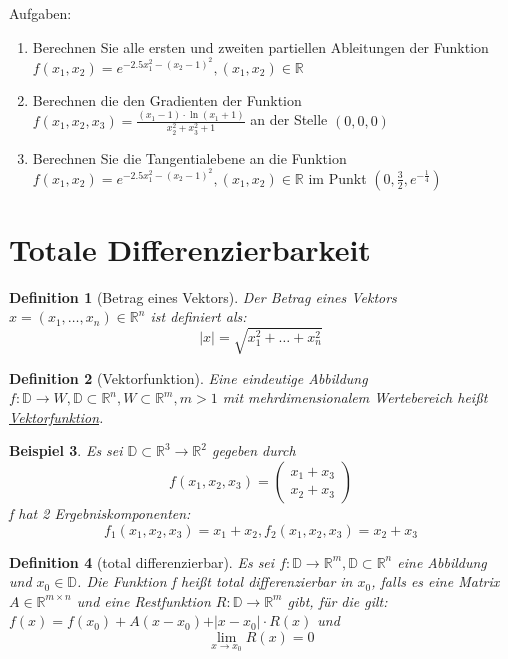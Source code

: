 \documentclass[12pt,a4paper]{scrreprt}
\newtheorem{defi}{Definition}[section]
\newtheorem{beispiel}[defi]{Beispiel}
\begin{document}
Aufgaben:

\begin{enumerate}
	\item Berechnen Sie alle ersten und zweiten partiellen Ableitungen der Funktion $f(x_1,x_2)=e^{-2.5x_1^2-(x_2-1)^2}, (x_1,x_2) \in \mathbb{R}$
	\item Berechnen die den Gradienten der Funktion $f(x_1,x_2,x_3)=\frac{(x_1-1)\cdot\ln(x_1+1)}{x_2^2+x_3^2+1}$ an der Stelle $(0,0,0)$
	\item Berechnen Sie die Tangentialebene an die Funktion  $f(x_1,x_2)=e^{-2.5x_1^2-(x_2-1)^2}, (x_1,x_2) \in \mathbb{R}$ im Punkt $(0,\frac{3}{2},e^{-\frac{1}{4}})$
\end{enumerate}

\section{Totale Differenzierbarkeit}

\begin{defi}[Betrag eines Vektors]
	Der Betrag eines Vektors $x=(x_1,\dots,x_n)\in\mathbb{R}^n$ ist definiert als:
	\[\vert x \vert = \sqrt{x_1^2+\dots+x_n^2}\]
\end{defi}

\begin{defi}[Vektorfunktion]
	Eine eindeutige Abbildung $f:\mathbb{D}\to W,\mathbb{D}\subset\mathbb{R}^n,W\subset\mathbb{R}^m,m>1$ mit mehrdimensionalem Wertebereich heißt \underline{Vektorfunktion}.
\end{defi}

\begin{beispiel}
	Es sei $\mathbb{D}\subset\mathbb{R}^3\to\mathbb{R}^2$ gegeben durch
	\[f(x_1,x_2,x_3)=\begin{pmatrix}
	x_1+x_3 \\ x_2+x_3
	\end{pmatrix}\]
	f hat 2 Ergebniskomponenten:
	\[f_1(x_1,x_2,x_3)=x_1+x_2,f_2(x_1,x_2,x_3)=x_2+x_3\]
\end{beispiel}

\begin{defi}[total differenzierbar]
	Es sei $f:\mathbb{D}\to \mathbb{R}^m,\mathbb{D}\subset\mathbb{R}^n$ eine Abbildung und $x_0\in\mathbb{D}$. Die Funktion f heißt total differenzierbar in $x_0$, falls es eine Matrix $A\in\mathbb{R}^{m\times n}$ und eine Restfunktion $R:\mathbb{D}\to\mathbb{R}^m$ gibt, für die gilt: $f(x)=f(x_0)+A(x-x_0)+\vert x-x_0 \vert\cdot R(x)$ und \[\lim_{x\to x_0} R(x)=0\]
\end{defi}
\end{document}

